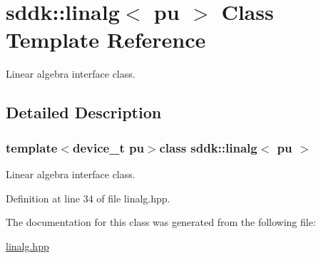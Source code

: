 \hypertarget{classsddk_1_1linalg}{}\section{sddk\+:\+:linalg$<$ pu $>$ Class Template Reference}
\label{classsddk_1_1linalg}


Linear algebra interface class.  




\subsection{Detailed Description}
\subsubsection*{template$<$device\+\_\+t pu$>$class sddk\+::linalg$<$ pu $>$}

Linear algebra interface class. 

Definition at line 34 of file linalg.\+hpp.



The documentation for this class was generated from the following file\+:\begin{DoxyCompactItemize}
\item 
\hyperlink{linalg_8hpp}{linalg.\+hpp}\end{DoxyCompactItemize}
